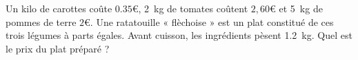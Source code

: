 
\begin{exercice}\label{exo2smath-0119}

    Un kilo de carottes coûte $0.35$€, \SI{2}{\kilo\gram} de tomates coûtent $2,60$€ et \SI{5}{\kilo\gram} de pommes de terre $2$€.  Une ratatouille « flèchoise » est un plat constitué de ces trois légumes à parts égales. Avant cuisson, les ingrédients pèsent \SI{1.2}{\kilo\gram}. Quel est le prix du plat préparé ?


\end{exercice}
